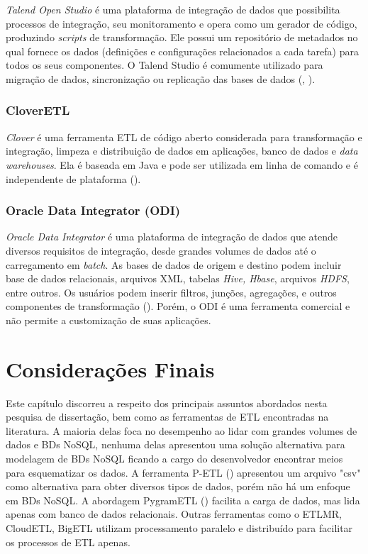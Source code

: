 \textit{Talend Open Studio} é uma plataforma de integração de dados que possibilita processos de integração, seu monitoramento e opera como um gerador de código, produzindo \textit{scripts} de transformação. Ele possui um repositório de metadados no qual fornece os dados (definições e configurações relacionados a cada tarefa) para todos os seus componentes. O Talend Studio é comumente utilizado para migração de dados, sincronização ou replicação das bases de dados  (\cite{mali:2015}, \cite{ETLtools}). 

\subsubsection{CloverETL}

\textit{Clover} é uma ferramenta ETL de código aberto considerada para transformação e integração, limpeza e distribuição de dados em aplicações, banco de dados e \textit{data warehouses}. Ela é baseada em Java e pode ser utilizada em linha de comando e é independente de plataforma  (\cite{mali:2015}).

\subsubsection{Oracle Data Integrator (ODI)}

\textit{Oracle Data Integrator} é uma plataforma de integração de dados que atende diversos requisitos de integração, desde grandes volumes de dados até o carregamento em \textit{batch}. As bases de dados de origem e destino podem incluir base de dados relacionais, arquivos XML, tabelas \textit{Hive, Hbase}, arquivos \textit{HDFS}, entre outros. Os usuários podem inserir filtros, junções, agregações, e outros componentes de transformação (\cite{silva:2016}). Porém, o ODI é uma ferramenta comercial e não permite a customização de suas aplicações.

\section{Considerações Finais}

Este capítulo discorreu a respeito dos principais assuntos abordados nesta pesquisa de dissertação, bem como as ferramentas de ETL encontradas na literatura. A maioria delas foca no desempenho ao lidar com grandes volumes de dados e BDs NoSQL, nenhuma delas apresentou uma solução alternativa para modelagem de BDs NoSQL ficando a cargo do desenvolvedor encontrar meios para esquematizar os dados. A ferramenta P-ETL (\cite{bala:2014}) apresentou um arquivo "csv" como alternativa para obter diversos tipos de dados, porém não há um enfoque em BDs NoSQL. A abordagem PygramETL (\cite{thomsen:2009}) facilita a carga de dados, mas lida apenas com banco de dados relacionais. Outras ferramentas como o ETLMR, CloudETL, BigETL utilizam processamento paralelo e distribuído para facilitar os processos de ETL apenas.

